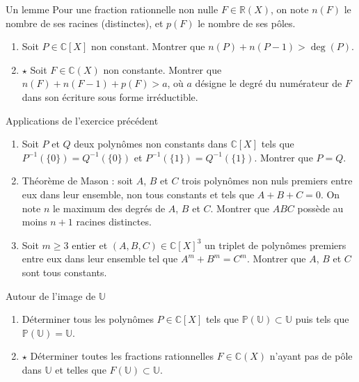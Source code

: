 \documentclass[french,a4paper]{article}
\renewcommand{\P}{\mathbb{P}}
\newcommand{\R}{\mathbb{R}}
\newcommand{\C}{\mathbb{C}}
\newcommand{\U}{\mathbb{U}}
\newcommand{\inv}{^{-1}}
\theoremstyle{plain}
\theoremstyle{definition}
\theoremstyle{remark}
\begin{document}
\begin{ex}[Moulin.18]{Un lemme}
	Pour une fraction rationnelle non nulle $F\in\R(X)$, on note $n(F)$ le nombre de ses racines (distinctes), et $p(F)$ le nombre de ses pôles.
	\begin{enumerate}
		\item Soit $P\in\C[X]$ non constant. Montrer que $n(P)+n(P-1)>\deg(P)$.
		\item $\star$ Soit $F\in\C(X)$ non constante. Montrer que $n(F)+n(F-1)+p(F)>a$, où $a$ désigne le degré du numérateur de $F$ dans son écriture sous forme irréductible.
	\end{enumerate}
\end{ex}

\begin{ex}[Moulin.19]{Applications de l'exercice précédent}
	\begin{enumerate}
		\item Soit $P$ et $Q$ deux polynômes non constants dans $\C[X]$ tels que $P\inv(\{0\})=Q\inv(\{0\})$ et $P\inv(\{1\})=Q\inv(\{1\})$. Montrer que $P=Q$.
		\item Théorème de Mason : soit $A$, $B$ et $C$ trois polynômes non nuls premiers entre eux dans leur ensemble, non tous constants et tels que $A+B+C=0$. On note $n$ le maximum des degrés de $A$, $B$ et $C$. Montrer que $ABC$ possède au moins $n+1$ racines distinctes.
		\item Soit $m\geqslant 3$ entier et $(A,B,C)\in\C[X]^3$ un triplet de polynômes premiers entre eux dans leur ensemble tel que $A^m+B^m=C^m$. Montrer que $A$, $B$ et $C$ sont tous constants.
	\end{enumerate}
\end{ex}

\begin{ex}[Moulin.20]{Autour de l'image de $\U$}
	\begin{enumerate}
		\item Déterminer tous les polynômes $P\in\C[X]$ tels que $\P(\U)\subset\U$ puis tels que $\P(\U)=\U$.
		\item $\star$ Déterminer toutes les fractions rationnelles $F\in\C(X)$ n'ayant pas de pôle dans $\U$ et telles que $F(\U)\subset\U$.
	\end{enumerate}
\end{ex}
\end{document}
